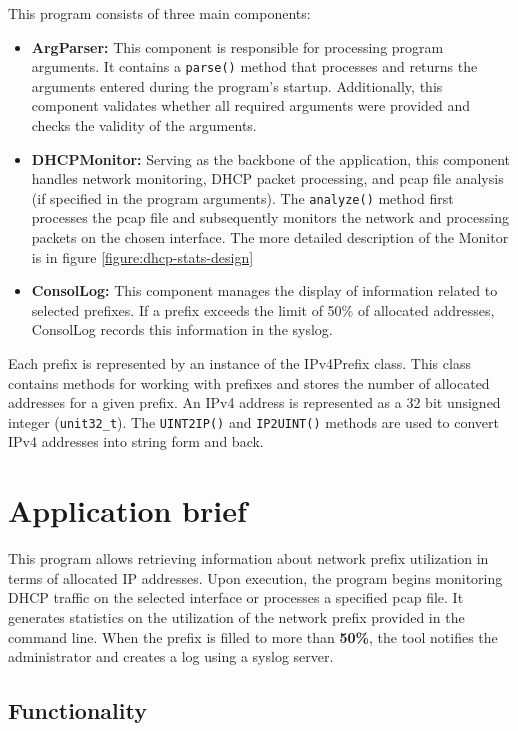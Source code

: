 \documentclass[a4paper, 11pt, a4paper]{article}
\begin{document}
This program consists of three main components:

\begin{itemize}
    \item \textbf{ArgParser: } This component is responsible for processing program arguments. It contains a \texttt{parse()} method that processes and returns the arguments entered during the program's startup. Additionally, this component validates whether all required arguments were provided and checks the validity of the arguments.
    \item \textbf{DHCPMonitor: }Serving as the backbone of the application, this component handles network monitoring, DHCP packet processing, and pcap file analysis (if specified in the program arguments). The \texttt{analyze()} method first processes the pcap file and subsequently monitors the network and processing packets on the chosen interface. The more detailed description of the Monitor is in figure \ref{figure:dhcp-stats-design}
    \item \textbf{ConsolLog: }This component manages the display of information related to selected prefixes. If a prefix exceeds the limit of 50\% of allocated addresses, ConsolLog records this information in the syslog.
\end{itemize}


\noindent Each prefix is represented by an instance of the IPv4Prefix class. This class contains methods for working with prefixes and stores the number of 
allocated addresses for a given prefix. An IPv4 address is represented as a 32 bit unsigned integer (\verb|unit32_t|). The \texttt{UINT2IP()} and \texttt{IP2UINT()} methods are used to 
convert IPv4 addresses into string form and back.

\section{Application brief}

\noindent This program allows retrieving information about network prefix utilization in terms of allocated IP addresses. 
Upon execution, the program begins monitoring DHCP traffic on the selected interface or processes a specified pcap file.
It generates statistics on the utilization of the network prefix provided in the command line.
When the prefix is filled to more than \textbf{50\%}, the tool notifies the administrator and creates a log using a syslog server.


\subsection{Functionality}
\end{document}
